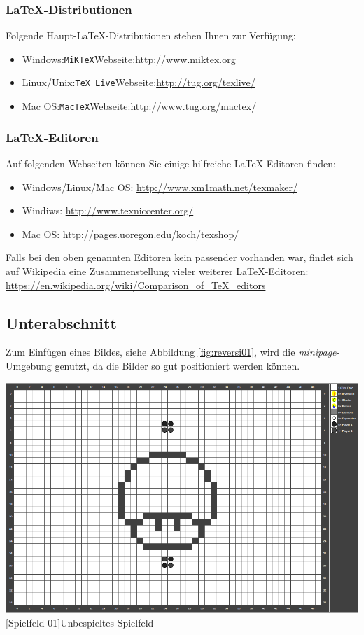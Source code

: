 \documentclass[12pt,a4paper,bibliography=totocnumbered,listof=totocnumbered]{scrartcl}
\begin{document}
\subsubsection{\LaTeX-Distributionen}
Folgende Haupt-\LaTeX-Distributionen stehen Ihnen zur Verfügung:
\begin{itemize}
  \item Windows:\quad \texttt{MiKTeX}\quad Webseite:\quad\url{http://www.miktex.org}
  \item Linux/Unix:\quad \texttt{TeX Live}\quad Webseite:\quad\url{http://tug.org/texlive/}
  \item Mac OS:\quad \texttt{MacTeX}\quad Webseite:\quad\url{http://www.tug.org/mactex/}
\end{itemize}

\subsubsection{\LaTeX-Editoren}
Auf folgenden Webseiten können Sie einige hilfreiche \LaTeX-Editoren finden:
\begin{itemize}
  \item Windows/Linux/Mac OS: \url{http://www.xm1math.net/texmaker/}
  \item Windiws: \url{http://www.texniccenter.org/}
  \item Mac OS: \url{http://pages.uoregon.edu/koch/texshop/}
\end{itemize}

Falls bei den oben genannten Editoren kein passender vorhanden war, findet sich auf Wikipedia eine Zusammenstellung vieler weiterer \LaTeX-Editoren:\\[1em]
\hspace*{3cm}\url{https://en.wikipedia.org/wiki/Comparison_of_TeX_editors}


\subsection{Unterabschnitt}
Zum Einfügen eines Bildes, siehe Abbildung \ref{fig:reversi01}, wird die \textit{minipage}-Umgebung genutzt, da die Bilder so gut positioniert werden können.

\vspace{1em}
\begin{minipage}{\linewidth}
	\centering
	\includegraphics[width=0.6\linewidth]{pics/gamefield01.png}
	[Spielfeld 01]{Unbespieltes Spielfeld\footnotemark }
	\label{fig:reversi01}
\end{minipage}
\end{document}
